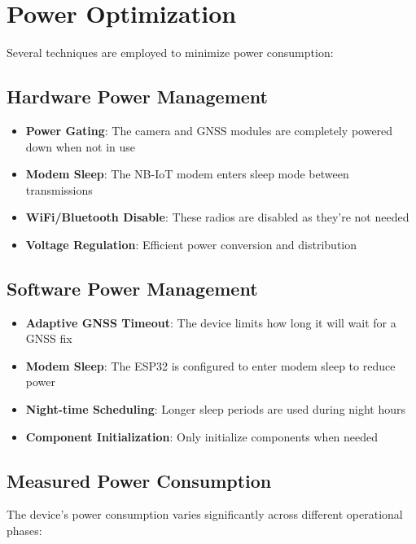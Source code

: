 \documentclass[11pt,a4paper]{article}
\begin{document}
\section{Power Optimization}

Several techniques are employed to minimize power consumption:

\subsection{Hardware Power Management}

\begin{itemize}
    \item \textbf{Power Gating}: The camera and GNSS modules are completely powered down when not in use
    \item \textbf{Modem Sleep}: The NB-IoT modem enters sleep mode between transmissions
    \item \textbf{WiFi/Bluetooth Disable}: These radios are disabled as they're not needed
    \item \textbf{Voltage Regulation}: Efficient power conversion and distribution
\end{itemize}

\subsection{Software Power Management}

\begin{itemize}
    \item \textbf{Adaptive GNSS Timeout}: The device limits how long it will wait for a GNSS fix
    \item \textbf{Modem Sleep}: The ESP32 is configured to enter modem sleep to reduce power
    \item \textbf{Night-time Scheduling}: Longer sleep periods are used during night hours
    \item \textbf{Component Initialization}: Only initialize components when needed
\end{itemize}

\subsection{Measured Power Consumption}

The device's power consumption varies significantly across different operational phases:
\end{document}

